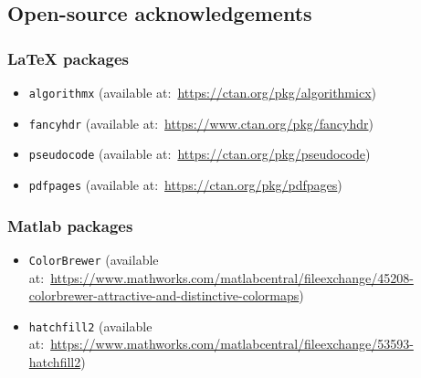 
\cleardoublepage
{}
{}

\small

%


\newpage
\subsection*{Open-source acknowledgements}
\subsubsection*{LaTeX packages}
\begin{itemize}
	\item \texttt{algorithmx} (available at:~\url{https://ctan.org/pkg/algorithmicx})	%
	\item \texttt{fancyhdr} (available at:~\url{https://www.ctan.org/pkg/fancyhdr})
	\item \texttt{pseudocode} (available at:~\url{https://ctan.org/pkg/pseudocode})
	\item \texttt{pdfpages} (available at:~\url{https://ctan.org/pkg/pdfpages})	%
\end{itemize}

\subsubsection*{Matlab packages}
\begin{itemize}
	\item \texttt{ColorBrewer} 	(available at:~\url{https://www.mathworks.com/matlabcentral/fileexchange/45208-colorbrewer-attractive-and-distinctive-colormaps}) %
	\item \texttt{hatchfill2} (available at:~\url{https://www.mathworks.com/matlabcentral/fileexchange/53593-hatchfill2}) %
\end{itemize}